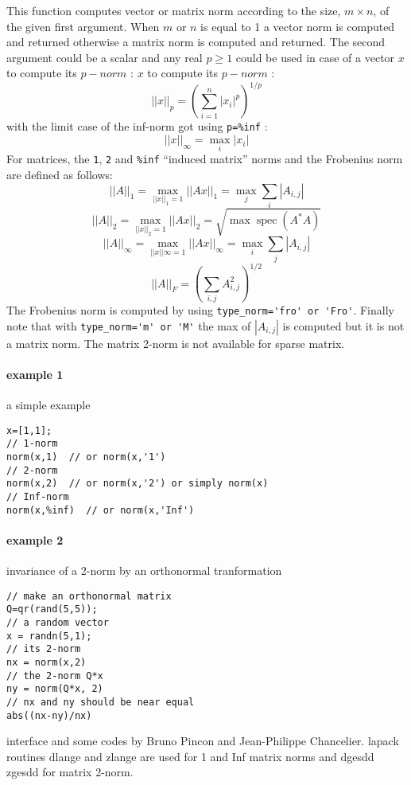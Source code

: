 \begin{mandescription}
This function computes vector or matrix norm according to the size, $m
\times n$, of the given first argument. When $m$ or $n$ is equal to 1 a vector
norm is computed and returned otherwise a matrix norm is computed and returned. 
The second argument could be a scalar and any real $p \ge 1$ could be used in case of a vector
$x$ to compute its $p-norm$ :
$x$ to compute its $p-norm$ :
$$
    ||x||_p = \left( \sum_{i=1}^n |x_i|^p \right)^{1/p}
$$
with the limit case of the inf-norm got using \verb+p=%inf+ :
$$
    ||x||_{\infty} = \max_i |x_i|
$$
For matrices, the \verb+1+, \verb+2+ and \verb+%inf+ ``induced matrix'' norms 
and the Frobenius norm are defined as follows:
$$
    ||A||_1 = \max_{||x||_1 = 1} ||Ax||_1 = \max_j \sum_i |A_{i,j}|  
$$
$$
    ||A||_2 = \max_{||x||_2 = 1} ||Ax||_2 = \sqrt{\max \mathop{\mathrm{spec}}(A^* A)}
$$
$$
    ||A||_{\infty} = \max_{||x||{\infty} = 1} ||Ax||_{\infty} = \max_i \sum_j |A_{i,j}|  
$$
$$
   ||A||_F =  \left( \sum_{i,j} A_{i,j}^2 \right)^{1/2}
$$
The Frobenius norm is computed by using  \verb+type_norm='fro' or 'Fro'+. 
Finally note that with \verb+type_norm='m' or 'M'+ the max 
of $|A_{i,j}|$ is computed but it is not a matrix norm.
The matrix 2-norm is not available for sparse matrix.
\end{mandescription}
\begin{examples}
\paragraph{example 1} a simple example
\begin{Verbatim}
x=[1,1];
// 1-norm
norm(x,1)  // or norm(x,'1')
// 2-norm
norm(x,2)  // or norm(x,'2') or simply norm(x)
// Inf-norm
norm(x,%inf)  // or norm(x,'Inf')
\end{Verbatim}

\paragraph{example 2} invariance of a 2-norm by an orthonormal tranformation
\begin{Verbatim}
// make an orthonormal matrix
Q=qr(rand(5,5));
// a random vector
x = randn(5,1);
// its 2-norm
nx = norm(x,2)
// the 2-norm Q*x
ny = norm(Q*x, 2)
// nx and ny should be near equal
abs((nx-ny)/nx)
\end{Verbatim}
\end{examples}


\begin{authors}
   interface and some codes by Bruno Pincon and Jean-Philippe
   Chancelier. lapack routines dlange and zlange are used for
   1 and Inf matrix norms and dgesdd zgesdd for matrix 2-norm.
\end{authors}
